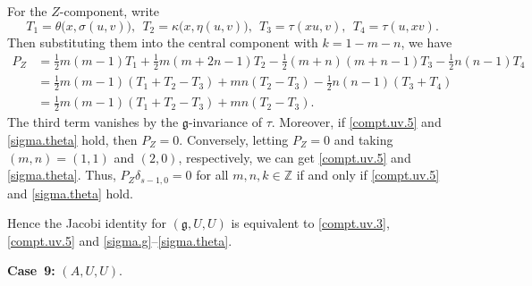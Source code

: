 \documentclass[12pt]{article}
\numberwithin{equation}{section}
\theoremstyle{definition}
\theoremstyle{plain}
\newcommand{\bZ}{\ensuremath{\mathbb{Z}}}
\newcommand{\afCase}[1]{\textbf{Case~#1:}}
\newcommand{\fg}{\mathfrak{g}}
\begin{document}
For the $Z$-component, write
\begin{equation*}
    T_1=\theta\big(x,\sigma(u,v)\big),\ \ T_2=\kappa\big(x,\eta(u,v)\big),\ \ T_3=\tau(xu,v),\ \ T_4=\tau(u,xv).
\end{equation*}
Then substituting them into the central component with $k=1-m-n$, we have
\begin{align*}
    P_Z&=\frac{1}{2}m(m-1)T_1+\frac{1}{2}m(m+2n-1)T_2-\frac{1}{2}(m+n)(m+n-1)T_3-\frac{1}{2}n(n-1)T_4\\
    &=\frac{1}{2}m(m-1)(T_1+T_2-T_3)+mn(T_2-T_3)-\frac{1}{2}n(n-1)(T_3+T_4)\\
    &=\frac{1}{2}m(m-1)(T_1+T_2-T_3)+mn(T_2-T_3).
\end{align*}
The third term vanishes by the $\fg$-invariance of $\tau$. Moreover, if \eqref{compt.uv.5} and \eqref{sigma.theta} hold, then $P_Z=0$. Conversely, letting $P_Z=0$ and taking $(m,n)=(1,1)$ and $(2,0)$, respectively, we can get \eqref{compt.uv.5} and \eqref{sigma.theta}. Thus, $P_Z\delta_{s-1,0}=0$ for all $m,n,k\in\bZ$ if and only if \eqref{compt.uv.5} and \eqref{sigma.theta} hold.

Hence the Jacobi identity for $(\fg,U,U)$ is equivalent to \eqref{compt.uv.3}, \eqref{compt.uv.5} and \eqref{sigma.g}--\eqref{sigma.theta}.


\afCase{9} $(A,U,U)$.
\end{document}
